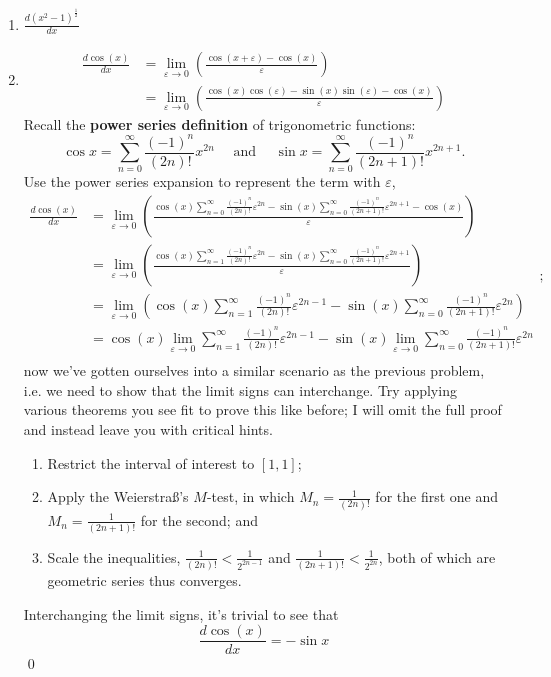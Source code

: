 \documentclass[10pt]{article}
\begin{document}
\begin{enumerate}[label=\alph*.]
\item $\displaystyle\frac{d(x^2-1)^\frac{1}{2}}{dx}$

\item \begin{align*} \frac{d \cos (x)}{d x} &=\lim _{\varepsilon \rightarrow 0}\left(\frac{\cos (x+\varepsilon)-\cos (x)}{\varepsilon}\right) \\ &=\lim _{\varepsilon \rightarrow 0}\left(\frac{\cos (x) \cos (\varepsilon)-\sin (x) \sin (\varepsilon)-\cos (x)}{\varepsilon}\right) 
\end{align*}
Recall the \textbf{power series definition} of trigonometric functions: $$\cos x=\sum_{n=0}^{\infty} \frac{(-1)^{n}}{(2 n) !} x^{2 n}\quad\text{ and }\quad\sin x=\sum_{n=0}^{\infty} \frac{(-1)^{n}}{(2 n+1) !} x^{2 n+1}.$$
Use the power series expansion to represent the term with $\varepsilon$,
$$\begin{aligned}
\frac{d \cos (x)}{d x}&=\lim _{\varepsilon \rightarrow 0}\left(\frac{\displaystyle\cos (x)\sum_{n=0}^{\infty} \frac{(-1)^{n}}{(2 n) !} \varepsilon^{2 n}-\sin (x)\sum_{n=0}^{\infty} \frac{(-1)^{n}}{(2 n+1) !} \varepsilon^{2 n+1}-\cos (x)}{\varepsilon}\right) \\ &=\lim _{\varepsilon \rightarrow 0}\left(\frac{\displaystyle\cos (x)\sum_{n=1}^{\infty} \frac{(-1)^{n}}{(2 n) !} \varepsilon^{2 n}-\sin (x)\sum_{n=0}^{\infty} \frac{(-1)^{n}}{(2 n+1) !} \varepsilon^{2 n+1}}{\varepsilon}\right) \\ &=\lim _{\varepsilon \rightarrow 0}\left(\displaystyle\cos (x)\sum_{n=1}^{\infty} \frac{(-1)^{n}}{(2 n) !} \varepsilon^{2 n-1}-\sin (x)\sum_{n=0}^{\infty} \frac{(-1)^{n}}{(2 n+1) !} \varepsilon^{2n}\right) \\ &=\cos (x)\lim _{\varepsilon \rightarrow 0}\sum_{n=1}^{\infty} \frac{(-1)^{n}}{(2 n) !} \varepsilon^{2 n-1}-\sin (x)\lim _{\varepsilon \rightarrow 0}\sum_{n=0}^{\infty} \frac{(-1)^{n}}{(2 n+1) !} \varepsilon^{2n} \\  \end{aligned};$$
now we've gotten ourselves into a similar scenario as the previous problem, i.e. we need to show that the limit signs can interchange. Try applying various theorems you see fit to prove this like before; I will omit the full proof and instead leave you with critical hints.
\begin{enumerate}[label=\arabic*.]
\item Restrict the interval of interest to $[1,1]$;
\item Apply the Weierstra{\ss}'s $M$-test, in which $M_n=\frac{1}{(2n)!}$ for the first one and $M_n=\frac{1}{(2n+1)!}$ for the second; and
\item Scale the inequalities, $\frac{1}{(2n)!}<\frac{1}{2^{2n-1}}$ and $\frac{1}{(2n+1)!}<\frac{1}{2^{2n}}$, both of which are geometric series thus converges.
\end{enumerate}
Interchanging the limit signs, it's trivial to see that
$$\frac{d \cos (x)}{d x}=-\sin x$$\qed


\end{enumerate}
\end{document}
